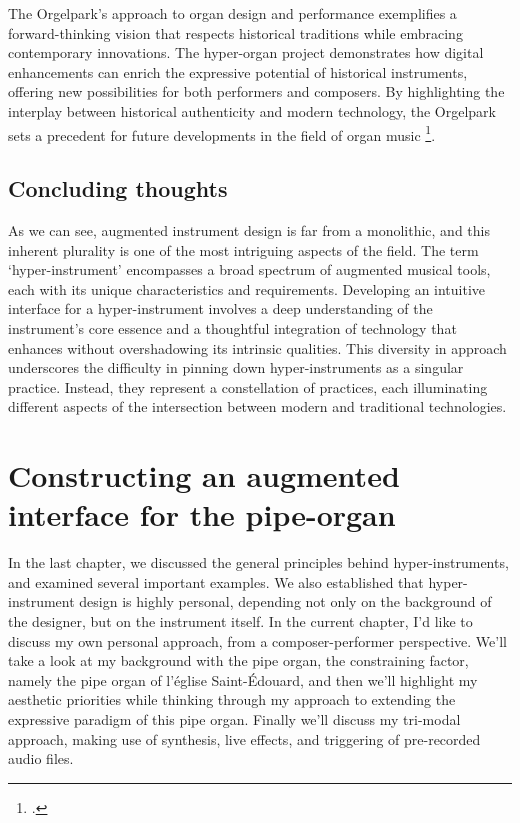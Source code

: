\documentclass[12pt,twoside,maitrise]{dms_ks}
\theoremstyle{definition}
\begin{document}
{{The Orgelpark's approach to organ design and performance exemplifies a forward-thinking vision that respects historical traditions while embracing contemporary innovations. 
The hyper-organ project demonstrates how digital enhancements can enrich the expressive potential of historical instruments, offering new possibilities for both performers and composers. 
By highlighting the interplay between historical authenticity and modern technology, the Orgelpark sets a precedent for future developments in the field of organ music \footcite[69]{fales_fusion_1994}.

\section{Concluding thoughts}

As we can see, augmented instrument design is far from a monolithic, and this inherent plurality is one of the most intriguing aspects of the field.
The term `hyper-instrument' encompasses a broad spectrum of augmented musical tools, each with its unique characteristics and requirements.
Developing an intuitive interface for a hyper-instrument involves a deep understanding of the instrument's core essence and a thoughtful integration of technology that enhances without overshadowing its intrinsic qualities.
This diversity in approach underscores the difficulty in pinning down hyper-instruments as a singular practice.
Instead, they represent a constellation of practices, each illuminating different aspects of the intersection between modern and traditional technologies.

\chapter{Constructing an augmented interface for the pipe-organ}

In the last chapter, we discussed the general principles behind hyper-instruments, and examined several important examples. 
We also established that hyper-instrument design is highly personal, depending not only on the background of the designer, but on the instrument itself. 
In the current chapter, I'd like to discuss my own personal approach, from a composer-performer perspective. We'll take a look at my background with the pipe organ, the constraining factor, namely the pipe organ of l'église Saint-Édouard, and then we'll highlight my aesthetic priorities while thinking through my approach to extending the expressive paradigm of this pipe organ. Finally we'll discuss my tri-modal approach, making use of synthesis, live effects, and triggering of pre-recorded audio files. 

}}
\end{document}
